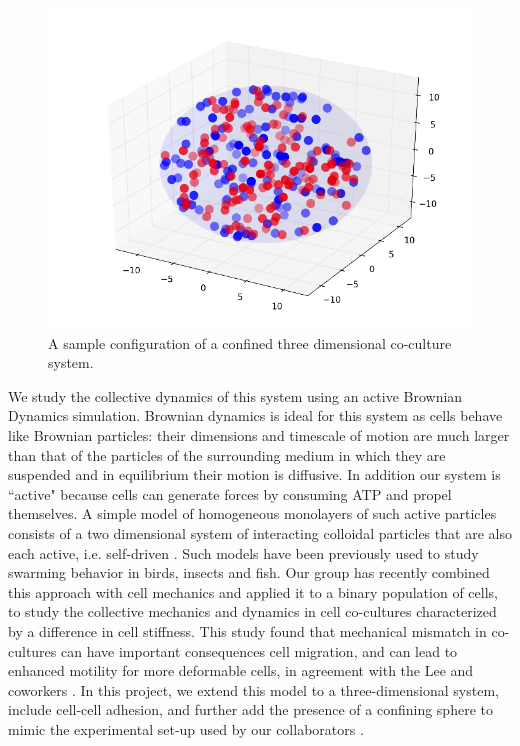 \documentclass[aps,prb,twocolumn,groupedaddress,nofootinbib,floatfix]{revtex4}
\begin{document}
\begin{figure}
  \includegraphics[width=1.0\columnwidth]{3dconf.png}
  \caption[3dconf]
    {A sample configuration of a confined three dimensional co-culture system.}
   \label{fig:3dconf}
\end{figure}

We study the collective dynamics of this system using an active Brownian Dynamics simulation. Brownian dynamics is ideal for this system as cells behave like Brownian particles: 
their dimensions and timescale of motion are much larger than that of the particles of the surrounding medium in which they are suspended and in equilibrium  their motion is diffusive. In addition
our system is ``active" because cells can generate forces by consuming ATP and propel themselves. A simple model of homogeneous monolayers of such active particles consists
of a two dimensional system of interacting colloidal particles that are also each active, i.e. self-driven \cite{FilyMarchetti,RednerBaskaran}. 
Such models have been previously used to study swarming  behavior \cite{Vicsek} in birds, insects and fish. Our group has recently combined this approach with cell 
mechanics and applied it to a binary population of cells, to study the collective mechanics and dynamics in cell co-cultures characterized by a difference in cell stiffness.
This study found that mechanical mismatch in co-cultures can have important consequences cell migration, and can lead to enhanced motility for more deformable cells\cite{Butcher}, 
in agreement with the Lee and coworkers \cite{Lee}. In this project, we extend this model to a three-dimensional system, include cell-cell adhesion, and further add the presence of a 
confining sphere to mimic the experimental set-up used by our collaborators \cite{Mingming}. 
\end{document}
